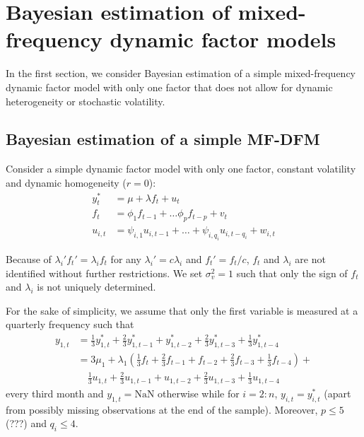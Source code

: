 \chapter{Bayesian estimation of mixed-frequency dynamic factor models}

In the first section, we consider Bayesian estimation of a simple mixed-frequency dynamic factor model with only one factor that does not allow for dynamic heterogeneity or stochastic volatility.

\section{Bayesian estimation of a simple MF-DFM}
\label{sec:est_simple}

Consider a simple dynamic factor model with only one factor, constant volatility and dynamic homogeneity ($r=0$): 
\begin{align}
y^*_t &= \mu + \lambda f_{t} + u_{t}     			  \label{eq:dfm_obs} \\
f_t &= \phi_1 f_{t-1} + \dots \phi_p f_{t-p} + v_t    \label{eq:dfm_trans_f}   \\
u_{i,t} &= \psi_{i,1} u_{i,t-1} + \dots + \psi_{i,q_i} u_{i,t-q_i} +  w_{i,t} 					   \label{eq:dfm_trans_u}
\end{align}

Because of $\lambda_i' f_t' = \lambda_i f_t$ for any $\lambda_i' = c \lambda_i$ and $f_t' = f_t/c$, $f_t$ and $\lambda_i$ are not identified without further restrictions. We set $\sigma^2_v=1$ such that only the sign of $f_t$ and $\lambda_i$ is not uniquely determined.

For the sake of simplicity, we assume that only the first variable is measured at a quarterly frequency such that
\begin{align}
y_{1,t} &=  \frac{1}{3} y^*_{1,t} + \frac{2}{3} y^*_{1,t-1} + y^*_{1,t-2} + \frac{2}{3} y^*_{1,t-3} + \frac{1}{3} y^*_{1,t-4} \\
&= 3\mu_1 + \lambda_1 \left(\frac{1}{3} f_{t} + \frac{2}{3} f_{t-1} +  f_{t-2} + \frac{2}{3} f_{t-3} + \frac{1}{3} f_{t-4} \right) + \\
& \quad \frac{1}{3} u_{1,t} + \frac{2}{3} u_{1,t-1} +  u_{1,t-2} + \frac{2}{3} u_{1,t-3} + \frac{1}{3} u_{1,t-4}
\end{align}
every third month and $y_{1,t} = \mathrm{NaN}$ otherwise while for $i=2:n$, $y_{i,t} = y^*_{i,t}$ (apart from possibly missing observations at the end of the sample). Moreover, $p \le 5$ (???) and $q_i \le 4$.\\

